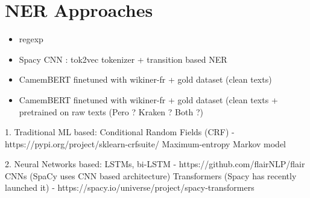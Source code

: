 \section{NER Approaches}

\begin{itemize}
    \item regexp
    \item Spacy CNN  : tok2vec tokenizer + transition based NER
    \item CamemBERT finetuned with wikiner-fr + gold dataset (clean texts)
    \item CamemBERT finetuned with wikiner-fr + gold dataset (clean texts + pretrained on raw texts (Pero ? Kraken ? Both ?)
\end{itemize}


1. Traditional ML based:
    Conditional Random Fields (CRF) - https://pypi.org/project/sklearn-crfsuite/
    Maximum-entropy Markov model

2. Neural Networks based:
    LSTMs, bi-LSTM - https://github.com/flairNLP/flair
    CNNs (SpaCy uses CNN based architecture)
    Transformers (Spacy has recently launched it) - https://spacy.io/universe/project/spacy-transformers